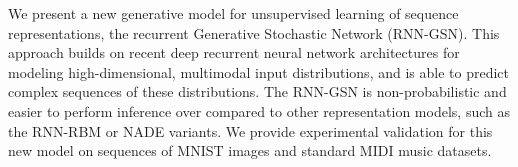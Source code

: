 We present a new generative model for unsupervised learning of sequence representations, the recurrent Generative Stochastic Network (RNN-GSN). This approach builds on recent deep recurrent neural network architectures for modeling high-dimensional, multimodal input distributions, and is able to predict complex sequences of these distributions. The RNN-GSN is non-probabilistic and easier to perform inference over compared to other representation models, such as the RNN-RBM or NADE variants. We provide experimental validation for this new model on sequences of MNIST images and standard MIDI music datasets.